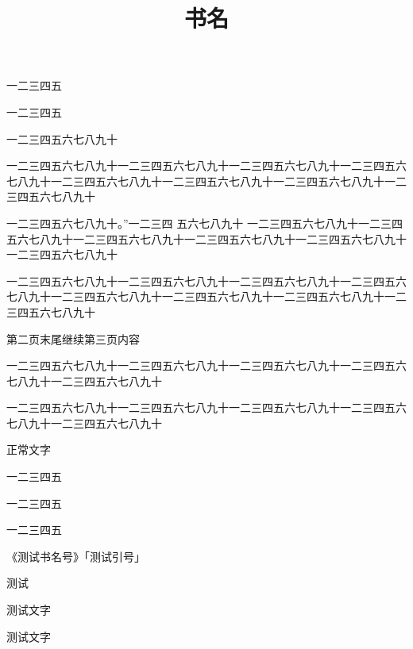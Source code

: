 \documentclass{ltc-guji}
\title{书名}
\begin{document}
\begin{正文}
一二三四五

一二三四五

\begin{段落}[indent=2]
一二三四五六七八九十
\end{段落}

一二三四五六七八九十一二三四五六七八九十一二三四五六七八九十一二三四五六七八九十一二三四五六七八九十一二三四五六七八九十一二三四五六七八九十一二三四五六七八九十

一二三四五六七八九十。”一二三四
五六七八九十
一二三四五六七八九十一二三四五六七八九十一二三四五六七八九十一二三四五六七八九十一二三四五六七八九十一二三四五六七八九十

一二三四五六七八九十一二三四五六七八九十一二三四五六七八九十一二三四五六七八九十一二三四五六七八九十一二三四五六七八九十一二三四五六七八九十一二三四五六七八九十

第二页末尾继续第三页内容

一二三四五六七八九十一二三四五六七八九十一二三四五六七八九十一二三四五六七八九十一二三四五六七八九十

一二三四五六七八九十一二三四五六七八九十一二三四五六七八九十一二三四五六七八九十一二三四五六七八九十

正常文字

一二三四五

一二三四五

一二三四五

《测试书名号》「测试引号」

测试

测试文字

测试文字

\end{正文}
\end{document}
